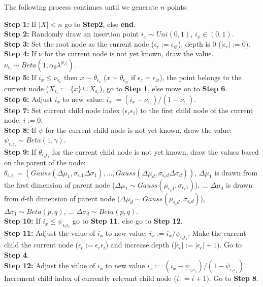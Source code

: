 \documentclass{article}
\begin{document}
	The following process continues until we generate $n$ points:
	
	\noindent\textbf{Step 1:} If $|X| < n$ go to \textbf{Step2}, else \textbf{end}.\\
	\textbf{Step 2:} Randomly draw an insertion point $i_x \sim Uni(0, 1)$, $i_x \in (0, 1)$.\\
	\textbf{Step 3:} Set the root node as the current node ($\epsilon_c := \epsilon_\varnothing$), depth is 0 ($|\epsilon_c| := 0$).\\
	\textbf{Step 4:} If $\nu$ for the current node is not yet known, draw the value. $\nu_{\epsilon_c} \sim Beta(1, \alpha_0 \lambda ^ {|\epsilon_c|} )$.\\
	\textbf{Step 5:} If $i_x \leq \nu_{\epsilon_c}$ then $x \sim \theta_{\epsilon_c}$ ($x \sim \theta_{\epsilon_\varnothing}$ if $\epsilon_c = \epsilon_\varnothing$), the point belongs to the current node ($X_{\epsilon_c} := \{x\} \cup X_{\epsilon_c}$), go to \textbf{Step 1}, else move on to \textbf{Step 6}.\\
	\textbf{Step 6:} Adjust $i_x$ to new value: $i_x := (i_x - \nu_{\epsilon_c}) / (1 - \nu_{\epsilon_c})$.\\
	\textbf{Step 7:} Set current child node index ($\epsilon_c\epsilon_i$) to the first child node of the current node: $i := 0$.\\
	\textbf{Step 8:} If $\psi$ for the current child node is not yet known, draw the value: $\psi_{\epsilon_c\epsilon_i} \sim Beta(1, \gamma)$.\\
	\textbf{Step 9:} If $\theta_{\epsilon_c\epsilon_i}$ for the current child node is not yet known, draw the values based on the parent of the node: 
	\noindent	
	$\theta_{\epsilon_c\epsilon_i} = (Gauss(\Delta\mu_1, \sigma_{\epsilon_c 1} \Delta\sigma_1), ..., Gauss(\Delta\mu_d, \sigma_{\epsilon_c d}\Delta\sigma_d))$,
	\noindent
	$\Delta\mu_1$ is drawn from the first dimension of parent node ($\Delta\mu_1 \sim Gauss(\mu_{\epsilon_c 1}, \sigma_{\epsilon_c 1})$),
	\noindent		
	...
	\noindent		
	$\Delta\mu_d$ is drawn from $d$-th dimension of parent node ($\Delta\mu_d \sim Gauss(\mu_{\epsilon_c d}, \sigma_{\epsilon_c d})$),
	\noindent		
	$\Delta\sigma_1\sim Beta(p, q)$,
	\noindent		
	...
	\noindent		
	$\Delta\sigma_d\sim Beta(p, q)$.\\
	\textbf{Step 10:} If $i_x \leq \psi_{\epsilon_c\epsilon_i}$ go to \textbf{Step 11}, else go to \textbf{Step 12}.\\
	\textbf{Step 11:} Adjust the value of $i_x$ to new value: $i_x := i_x / \psi_{\epsilon_c\epsilon_i}$. Make the current child the current node ($\epsilon_c := \epsilon_c\epsilon_i$) and increase depth ($|\epsilon_c| := |\epsilon_c| + 1$). Go to \textbf{Step 4}.\\
	\textbf{Step 12:} Adjust the value of $i_x$ to new value $i_x := (i_x - \psi_{\epsilon_c\epsilon_i}) / (1 - \psi_{\epsilon_c\epsilon_i})$. Increment child index of currently relevant child node ($i: = i + 1$). Go to \textbf{Step 8}.
	
\end{document}
